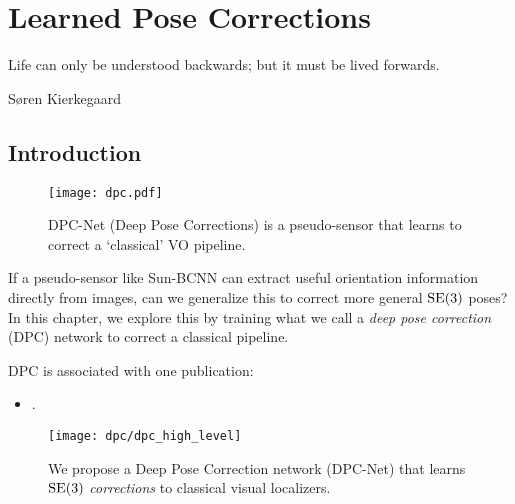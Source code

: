 \chapter{Learned Pose Corrections}
\label{ch:dpc}
\epigraph{Life can only be understood backwards; but it must be lived forwards.}{Søren Kierkegaard}

\section{Introduction}

\begin{figure*}[h!]
\centering
\texttt{[image: dpc.pdf]}
 \caption{DPC-Net (Deep Pose Corrections) is a pseudo-sensor that learns to correct a `classical' VO pipeline.}
 \label{fig:dpc_intro_fig}
\end{figure*}

If a pseudo-sensor like Sun-BCNN can extract useful orientation information directly from images, can we generalize this to correct more general $\mathrm{SE}(3)$ poses? In this chapter, we explore this by training what we call a \textit{deep pose correction} (DPC) network to correct a classical pipeline.

DPC is associated with one publication:
\begin{itemize}
\item {}.
\end{itemize}


\begin{wrapfigure}{r}{0.5\textwidth}
	\centering
	\texttt{[image: dpc/dpc\_high\_level]}
	\caption{We propose a Deep Pose Correction network (DPC-Net) that learns $\mathrm{SE}(3)$ \textit{corrections} to classical visual localizers.}
	\label{fig:dpc_system_overview}
	\vspace{-1.5em}
\end{wrapfigure}

